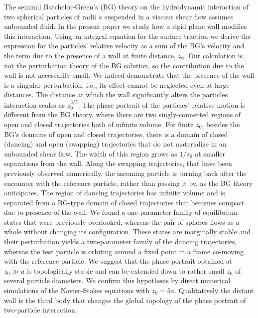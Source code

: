 %
\graphicspath{{paper4/}}%
%
%
%
\begin{paper}

\makepapertitle

%
\begin{paperabstract}
	
The seminal Batchelor-Green's (BG) theory on the hydrodynamic interaction of two spherical particles of radii $a$ suspended in a viscous shear flow assumes unbounded fluid. In the present paper we study how a rigid plane wall modifies this interaction. Using an integral equation for the surface traction we derive the expression for the particles' relative velocity as a sum of the BG's velocity and the term due to the presence of a wall at finite distance, $z_0$. Our calculation is not the perturbation theory of the BG solution, so the contribution due to the wall is not necessarily small. We indeed demonstrate that the presence of the wall is a singular perturbation, i.e., its effect cannot be neglected even at large distances. The distance at which the wall significantly alters the particles interaction scales as $z_0^{3/5}$. The phase portrait of the particles' relative motion is different from the BG theory, where there are two singly-connected regions of open and closed trajectories both of infinite volume. For finite $z_0$, besides the BG's domains of open and closed trajectories, there is a domain of closed (dancing) and open (swapping) trajectories that do not materialize in an unbounded shear flow. The width of this region grows as $1/z_0$ at smaller separations from the wall. Along the swapping trajectories, that have been previously observed numerically, the incoming particle is turning back after the encounter with the reference particle, rather than passing it by, as the BG theory anticipates. The region of dancing trajectories has infinite volume and is separated from a BG-type domain of closed trajectories that becomes compact due to presence of the wall. We found a one-parameter family of equilibrium states that were previously overlooked, whereas the pair of spheres flows as a whole without changing its configuration. These states are marginally stable and their perturbation yields a two-parameter family of the dancing trajectories, whereas the test particle is orbiting around a fixed point in a frame co-moving with the reference particle. We suggest that the phase portrait obtained at $z_0 \gg a$ is topologically stable and can be extended down to rather small $z_0$ of several particle diameters. We confirm this hypothesis by direct numerical simulations of the Navier-Stokes equations with $z_0=5a$. Qualitatively the distant wall is the third body that changes the global topology of the phase portrait of two-particle interaction.
\end{paperabstract}



\end{paper}
